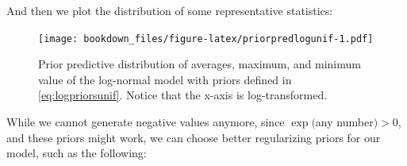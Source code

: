 \documentclass[12pt,]{krantz}
\newenvironment{Shaded}{\begin{snugshade}}{\end{snugshade}}
\newcommand{\DataTypeTok}[1]{\textcolor[rgb]{0.13,0.29,0.53}{#1}}
\newcommand{\DecValTok}[1]{\textcolor[rgb]{0.00,0.00,0.81}{#1}}
\newcommand{\FloatTok}[1]{\textcolor[rgb]{0.00,0.00,0.81}{#1}}
\newcommand{\KeywordTok}[1]{\textcolor[rgb]{0.13,0.29,0.53}{\textbf{#1}}}
\newcommand{\NormalTok}[1]{#1}
\newcommand{\OperatorTok}[1]{\textcolor[rgb]{0.81,0.36,0.00}{\textbf{#1}}}
\newcommand{\StringTok}[1]{\textcolor[rgb]{0.31,0.60,0.02}{#1}}
\theoremstyle{definition}
\theoremstyle{definition}
\theoremstyle{definition}
\theoremstyle{remark}
\begin{document}
And then we plot the distribution of some representative statistics:



\begin{Shaded}
\end{Shaded}

\begin{figure}
\centering
\texttt{[image: bookdown\_files/figure-latex/priorpredlogunif-1.pdf]}
\caption{\label{fig:priorpredlogunif}Prior predictive distribution of averages, maximum, and minimum value of the log-normal model with priors defined in \eqref{eq:logpriorsunif}. Notice that the x-axis is log-transformed.}
\end{figure}

While we cannot generate negative values anymore, since \(\exp(\)any number\() > 0\), and these priors might work, we can choose better regularizing priors for our model, such as the following:
\end{document}

